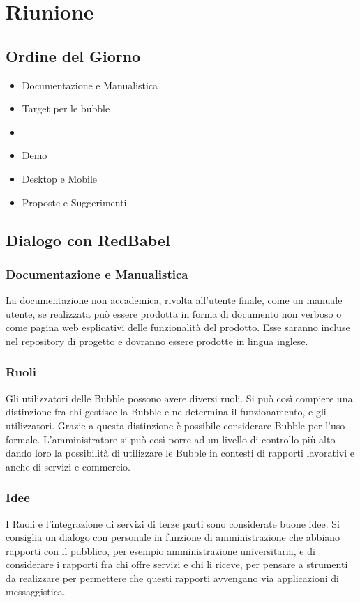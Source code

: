 \section{Riunione}
\subsection{Ordine del Giorno}

\begin{itemize}
	\item Documentazione e Manualistica
	\item Target per le bubble
	\item {}
	\item Demo
	\item Desktop e Mobile
	\item Proposte e Suggerimenti
\end{itemize}

\subsection{Dialogo con RedBabel}

\subsubsection{Documentazione e Manualistica}
La documentazione non accademica, rivolta all’utente finale, come un manuale utente, se realizzata può essere prodotta in forma di documento non verboso o come pagina web esplicativi delle funzionalità del prodotto. 
Esse saranno incluse nel repository di progetto e dovranno essere prodotte in lingua inglese.

\subsubsection{Ruoli}
Gli utilizzatori delle Bubble possono avere diversi ruoli. Si può così compiere una distinzione fra chi gestisce la Bubble e ne determina il funzionamento, e gli utilizzatori.
Grazie a questa distinzione è possibile considerare Bubble per l’uso formale. 
L’amministratore si può così porre ad un livello di controllo più alto dando loro la possibilità di utilizzare le Bubble in contesti di rapporti lavorativi e anche di servizi e commercio.

\subsubsection{Idee}
I Ruoli e l’integrazione di servizi di terze parti sono considerate buone idee.
Si consiglia un dialogo con personale in funzione di amministrazione che abbiano rapporti con il pubblico, per esempio amministrazione universitaria, e di considerare i rapporti fra chi offre servizi e chi li riceve, per pensare a strumenti da realizzare per permettere che questi rapporti avvengano via applicazioni di messaggistica.  

